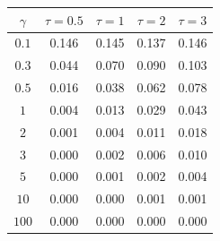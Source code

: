 \documentclass[border=2pt]{standalone}
\begin{document}
\begin{tabular}{ccccc}
\toprule
$\gamma$  &  $\tau=0.5$ & $\tau=1$ & $\tau=2$ & $\tau=3$ \\
\midrule
  $0.1$  &  0.146  &  0.145  &  0.137  &  0.146 \\
  $0.3$  &  0.044  &  0.070  &  0.090  &  0.103 \\
  $0.5$  &  0.016  &  0.038  &  0.062  &  0.078 \\
  $1$  &  0.004  &  0.013  &  0.029  &  0.043 \\
  $2$  &  0.001  &  0.004  &  0.011  &  0.018 \\
  $3$  &  0.000  &  0.002  &  0.006  &  0.010 \\
  $5$  &  0.000  &  0.001  &  0.002  &  0.004 \\
  $10$  &  0.000  &  0.000  &  0.001  &  0.001 \\
  $100$  &  0.000  &  0.000  &  0.000  &  0.000 \\
\bottomrule
\end{tabular}
\end{document}
